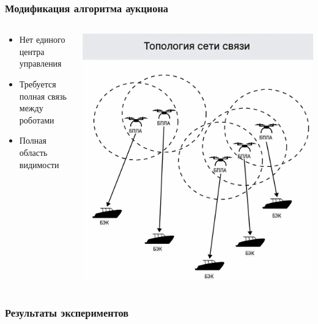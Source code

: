 \documentclass{beamer}
\begin{document}
	\begin{frame}
		\frametitle{Модификация алгоритма аукциона}
		\begin{columns}[T] %
			\begin{column}{0.4\textwidth} %
				\begin{itemize}
					\item Нет единого центра управления
					\item Требуется полная связь между роботами
					\item Полная область видимости
				\end{itemize}
			\end{column}
			\begin{column}{0.6\textwidth} %
				\centering
				\includegraphics[width=\textwidth,height=0.85\textheight,keepaspectratio]{topology_mod_auct.png}
			\end{column}
		\end{columns}
	\end{frame}
	
	\begin{frame}
		\frametitle{Результаты экспериментов}
	\end{frame}
	
\end{document}
